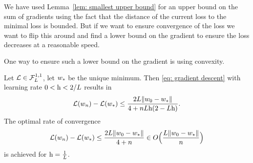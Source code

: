We have used Lemma~\ref{lem: smallest upper bound} for an upper bound on the
sum of gradients using the fact that the distance of the current loss to the
minimal loss is bounded. But if we want to ensure convergence of the loss we
want to flip this around and find a lower bound on the gradient to ensure
the loss decreases at a reasonable speed.

One way to ensure such a lower bound on the gradient is using convexity.

\begin{theorem}
	\label{thm: convex function GD loss upper bound}
	Let \(\mathcal{L}\in\mathcal{F}^{1,1}_{L}\), let \(w_*\) be the unique minimum.
	Then \ref{eq: gradient descent} with learning rate \(0 < \text{h} < 2/L\) results in
	\begin{align}\label{eq: convex function loss upper bound}
		\mathcal{L}(w_n) - \mathcal{L}(w_*)
		\le \frac{2L\|w_0 - w_*\|}{4 + nL\text{h}(2-L\text{h})}.
	\end{align}
	The optimal rate of convergence 
	\begin{align*}
		\mathcal{L}(w_n) - \mathcal{L}(w_*)
		\le \frac{2L\|w_0-w_*\|}{4+n}
		\in O\Big(\frac{L\|w_0-w_*\|}{n}\Big)
	\end{align*}
	is achieved for \(\text{h}=\tfrac1{L}\).
\end{theorem}

